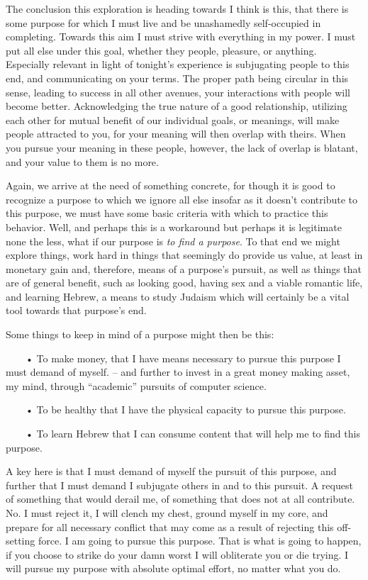 \qquad The conclusion this exploration is heading towards I think is
this, that there is some purpose for which I must live and be
unashamedly self-occupied in completing. Towards this aim I must strive
with everything in my power. I must put all else under this goal,
whether they people, pleasure, or anything. Especially relevant in light
of tonight's experience is subjugating people to this end, and
communicating on your terms. The proper path being circular in this
sense, leading to success in all other avenues, your interactions with
people will become better. Acknowledging the true nature of a good
relationship, utilizing each other for mutual benefit of our individual
goals, or meanings, will make people attracted to you, for your meaning
will then overlap with theirs. When you pursue your meaning in these
people, however, the lack of overlap is blatant, and your value to them
is no more.

\qquad Again, we arrive at the need of something concrete, for though it
is good to recognize a purpose to which we ignore all else insofar as it
doesn't contribute to this purpose, we must have some basic criteria
with which to practice this behavior. Well, and perhaps this is a
workaround but perhaps it is legitimate none the less, what if our
purpose is \emph{to find a purpose}. To that end we might explore
things, work hard in things that seemingly do provide us value, at least
in monetary gain and, therefore, means of a purpose's pursuit, as well
as things that are of general benefit, such as looking good, having sex
and a viable romantic life, and learning Hebrew, a means to study
Judaism which will certainly be a vital tool towards that purpose's end.

Some things to keep in mind of a purpose might then be this:

~~~~• To make money, that I have means necessary to pursue this purpose
I must demand of myself. -- and further to invest in a great money
making asset, my mind, through ``academic'' pursuits of computer
science.

~~~~• To be healthy that I have the physical capacity to pursue this
purpose.

~~~~• To learn Hebrew that I can consume content that will help me to
find this purpose.

A key here is that I must demand of myself the pursuit of this purpose,
and further that I must demand I subjugate others in and to this
pursuit. A request of something that would derail me, of something that
does not at all contribute. No. I must reject it, I will clench my
chest, ground myself in my core, and prepare for all necessary conflict
that may come as a result of rejecting this off-setting force. I am
going to pursue this purpose. That is what is going to happen, if you
choose to strike do your damn worst I will obliterate you or die trying.
I will pursue my purpose with absolute optimal effort, no matter what
you do.

